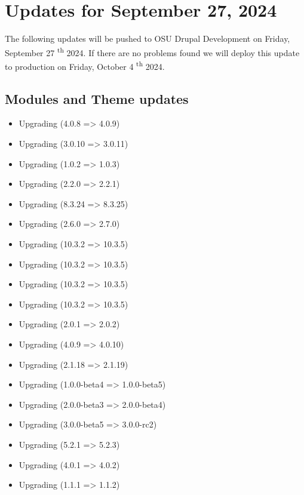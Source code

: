 \section{Updates for September 27, 2024}
The following updates will be pushed to OSU Drupal Development on Friday, September 27 \textsuperscript{th} 2024.
If there are no problems found we will deploy this update to production on Friday, October 4 \textsuperscript{th} 2024.
\subsection{Modules and Theme updates}
\begin{itemize}
    \item Upgrading  (4.0.8 => 4.0.9)
    \item Upgrading  (3.0.10 => 3.0.11)
    \item Upgrading  (1.0.2 => 1.0.3)
    \item Upgrading  (2.2.0 => 2.2.1)
    \item Upgrading  (8.3.24 => 8.3.25)
    \item Upgrading  (2.6.0 => 2.7.0)
    \item Upgrading  (10.3.2 => 10.3.5)
    \item Upgrading  (10.3.2 => 10.3.5)
    \item Upgrading  (10.3.2 => 10.3.5)
    \item Upgrading  (10.3.2 => 10.3.5)
    \item Upgrading  (2.0.1 => 2.0.2)
    \item Upgrading  (4.0.9 => 4.0.10)
    \item Upgrading  (2.1.18 => 2.1.19)
    \item Upgrading  (1.0.0-beta4 => 1.0.0-beta5)
    \item Upgrading  (2.0.0-beta3 => 2.0.0-beta4)
    \item Upgrading  (3.0.0-beta5 => 3.0.0-rc2)
    \item Upgrading  (5.2.1 => 5.2.3)
    \item Upgrading  (4.0.1 => 4.0.2)
    \item Upgrading  (1.1.1 => 1.1.2)

\end{itemize}
